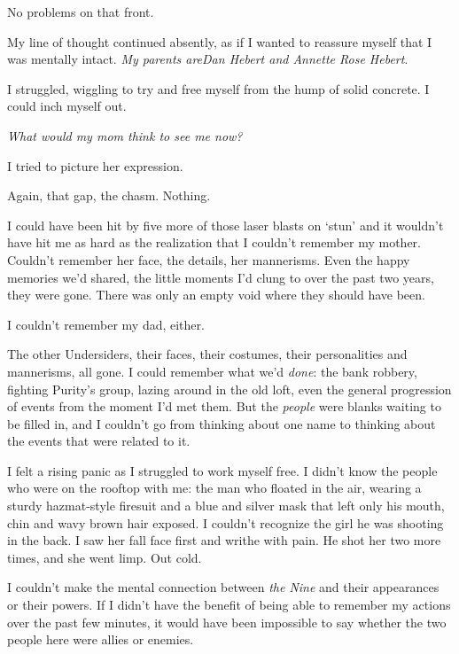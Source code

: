 No problems on that front.



My line of thought continued absently, as if I wanted to reassure myself that I was mentally intact.  \emph{My parents are}\emph{Dan Hebert and Annette Rose Hebert}.



I struggled, wiggling to try and free myself from the hump of solid concrete.  I could inch myself out.



\emph{What would my mom think to see me now?}



I tried to picture her expression.



Again, that gap, the chasm.  Nothing.



I could have been hit by five more of those laser blasts on `stun' and it wouldn't have hit me as hard as the realization that I couldn't remember my mother.  Couldn't remember her face, the details, her mannerisms.  Even the happy memories we'd shared, the little moments I'd clung to over the past two years, they were gone.  There was only an empty void where they should have been.



I couldn't remember my dad, either.



The other Undersiders, their faces, their costumes, their personalities and mannerisms, all gone.  I could remember what we'd \emph{done}: the bank robbery, fighting Purity's group, lazing around in the old loft, even the general progression of events from the moment I'd met them.  But the \emph{people} were blanks waiting to be filled in, and I couldn't go from thinking about one name to thinking about the events that were related to it.



I felt a rising panic as I struggled to work myself free.  I didn't know the people who were on the rooftop with me: the man who floated in the air, wearing a sturdy hazmat-style firesuit and a blue and silver mask that left only his mouth, chin and wavy brown hair exposed.  I couldn't recognize the girl he was shooting in the back.  I saw her fall face first and writhe with pain.  He shot her two more times, and she went limp.  Out cold.



I couldn't make the mental connection between \emph{the Nine} and their appearances or their powers.  If I didn't have the benefit of being able to remember my actions over the past few minutes, it would have been impossible to say whether the two people here were allies or enemies.



